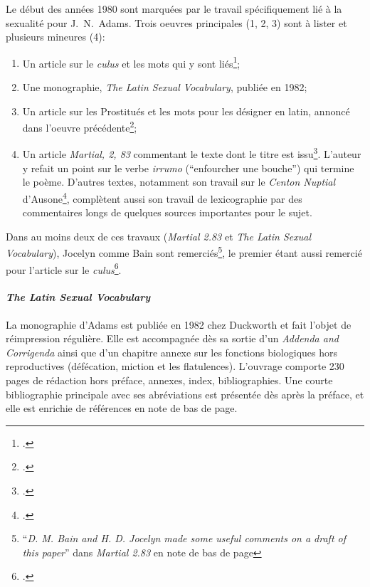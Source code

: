 Le début des années 1980 sont marquées par le travail spécifiquement lié à la sexualité pour J.~N.~Adams. Trois oeuvres principales (1, 2, 3) sont à lister et plusieurs mineures (4):
\begin{enumerate}
    \item Un article sur le \textit{culus} et les mots qui y sont liés\footcite{adams_culus_1981};
    \item Une monographie, \textit{The Latin Sexual Vocabulary}, publiée en 1982;
    \item Un article sur les Prostitués et les mots pour les désigner en latin, annoncé dans l'oeuvre précédente\footcite{adams_words_1983};
    \item Un article \textit{Martial, 2, 83} commentant le texte dont le titre est issu\footcite{adams_martial_1983}. L'auteur y refait un point sur le verbe \textit{irrumo} (\enquote{enfourcher une bouche}) qui termine le poème. D'autres textes, notamment son travail sur le \textit{Centon Nuptial} d'Ausone\footcite{adams1981ausonius}, complètent aussi son travail de lexicographie par des commentaires longs de quelques sources importantes pour le sujet.
\end{enumerate}
Dans au moins deux de ces travaux (\textit{Martial 2.83} et \textit{The Latin Sexual Vocabulary}), Jocelyn comme Bain sont remerciés\footnote{\enquote{\textit{D. M. Bain and H. D. Jocelyn made some useful comments on a draft of this paper}} dans \textit{Martial 2.83} en note de bas de page}, le premier étant aussi remercié pour l'article sur le \textit{culus}\footcite[p.~264]{adams_culus_1981}. 

\paragraph{\textit{The Latin Sexual Vocabulary}}

La monographie d'Adams est publiée en 1982 chez Duckworth et fait l'objet de réimpression régulière. Elle est accompagnée dès sa sortie d'un \textit{Addenda and Corrigenda} ainsi que d'un chapitre annexe sur les fonctions biologiques hors reproductives (défécation, miction et les flatulences). L'ouvrage comporte 230 pages de rédaction hors préface, annexes, index, bibliographies. Une courte bibliographie principale avec ses abréviations est présentée dès après la préface, et elle est enrichie de références en note de bas de page.

